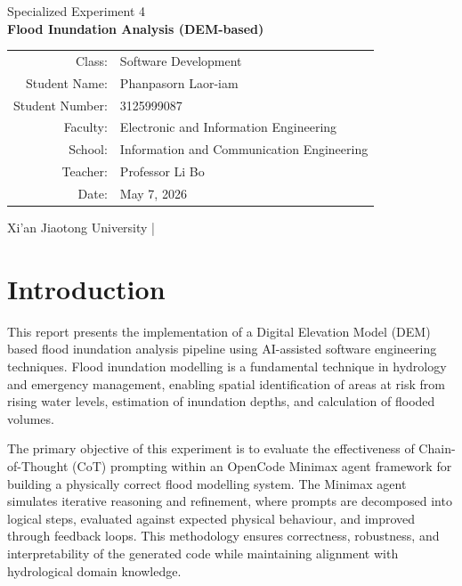 \documentclass[12pt, a4paper]{article}
\begin{document}
\thispagestyle{empty}

\begin{center}
  \vspace*{1cm}
  {\large Specialized Experiment 4}\\[0.5cm]
  {\LARGE\bfseries Flood Inundation Analysis (DEM-based)}\\[1.5cm]

  \begin{tabular}{rl}
    Class:          & Software Development \\[2pt]
    Student Name:   & Phanpasorn Laor-iam \\[2pt]
    Student Number: & 3125999087 \\[2pt]
    Faculty:        & Electronic and Information Engineering \\[2pt]
    School:         & Information and Communication Engineering \\[2pt]
    Teacher:        & Professor Li Bo \\[2pt]
    Date:           & May 7, 2026 \\
  \end{tabular}

  \vfill
  Xi'an Jiaotong University \quad|
\end{center}

\newpage
\pagestyle{fancy}

\tableofcontents
\newpage

\section{Introduction}

This report presents the implementation of a Digital Elevation Model (DEM) based flood inundation analysis pipeline using AI-assisted software engineering techniques. Flood inundation modelling is a fundamental technique in hydrology and emergency management, enabling spatial identification of areas at risk from rising water levels, estimation of inundation depths, and calculation of flooded volumes.

The primary objective of this experiment is to evaluate the effectiveness of Chain-of-Thought (CoT) prompting within an OpenCode Minimax agent framework for building a physically correct flood modelling system. The Minimax agent simulates iterative reasoning and refinement, where prompts are decomposed into logical steps, evaluated against expected physical behaviour, and improved through feedback loops. This methodology ensures correctness, robustness, and interpretability of the generated code while maintaining alignment with hydrological domain knowledge.
\end{document}
